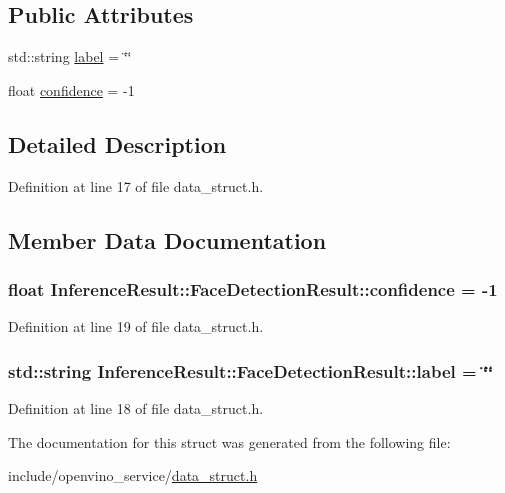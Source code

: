 \subsection*{Public Attributes}
\begin{DoxyCompactItemize}
\item 
std\+::string \hyperlink{structInferenceResult_1_1FaceDetectionResult_a395efa90912c78ac770588b57a474bd3}{label} = \char`\"{}\char`\"{}
\item 
float \hyperlink{structInferenceResult_1_1FaceDetectionResult_a7df2ce07767a0ef2c7b3ca27e9e20bc0}{confidence} = -\/1
\end{DoxyCompactItemize}


\subsection{Detailed Description}


Definition at line 17 of file data\+\_\+struct.\+h.



\subsection{Member Data Documentation}
\subsubsection[{\texorpdfstring{confidence}{confidence}}]{\setlength{\rightskip}{0pt plus 5cm}float Inference\+Result\+::\+Face\+Detection\+Result\+::confidence = -\/1}\hypertarget{structInferenceResult_1_1FaceDetectionResult_a7df2ce07767a0ef2c7b3ca27e9e20bc0}{}\label{structInferenceResult_1_1FaceDetectionResult_a7df2ce07767a0ef2c7b3ca27e9e20bc0}


Definition at line 19 of file data\+\_\+struct.\+h.

\subsubsection[{\texorpdfstring{label}{label}}]{\setlength{\rightskip}{0pt plus 5cm}std\+::string Inference\+Result\+::\+Face\+Detection\+Result\+::label = \char`\"{}\char`\"{}}\hypertarget{structInferenceResult_1_1FaceDetectionResult_a395efa90912c78ac770588b57a474bd3}{}\label{structInferenceResult_1_1FaceDetectionResult_a395efa90912c78ac770588b57a474bd3}


Definition at line 18 of file data\+\_\+struct.\+h.



The documentation for this struct was generated from the following file\+:\begin{DoxyCompactItemize}
\item 
include/openvino\+\_\+service/\hyperlink{data__struct_8h}{data\+\_\+struct.\+h}\end{DoxyCompactItemize}
